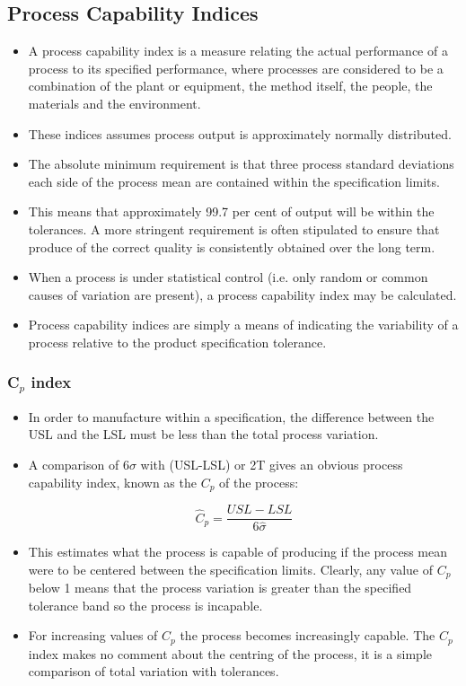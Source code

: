 \documentclass[MASTER-SPC.tex]{subfiles}
\begin{document}
	\subsection{Process Capability Indices}
\begin{itemize}
\item A process capability index is a measure relating the actual performance of a process to its specified performance, where processes are considered to be a combination of the plant or equipment, the method itself, the people, the materials and the environment. 
\item 	These indices assumes process output is approximately normally distributed.
\item 	
	The absolute minimum requirement is that three process standard deviations each side of the process mean are contained within the specification limits. 
	\item This means that approximately 99.7 per cent of output will be within the tolerances. A more stringent requirement is often stipulated to ensure that produce of the correct quality is consistently obtained over the long term.
	
\item 	When a process is under statistical control (i.e. only random or common
	causes of variation are present), a process capability index may be calculated. 
\item Process capability indices are simply a means of indicating the variability of a process relative to the product specification tolerance.
\end{itemize}	
\newpage


	
	\subsubsection*{C$_p$ index}
\begin{itemize}
\item	In order to manufacture within a specification, the difference between the
	USL and the LSL must be less than the total process variation.
	
\item A comparison of $6\sigma$ with (USL-LSL) or 2T gives an obvious process capability index, known as the $C_p$ of the process:
	
	
	\[\hat{C}_p = \frac{USL - LSL} {6 \hat{\sigma}}\]	
\item This estimates what the process is capable of producing if the process mean were to be centered between the specification limits. 
	Clearly, any value of $C_p$ below 1 means that the process variation is greater than the specified tolerance band so the process is incapable. 
	
\item For increasing values of $C_p$ the process becomes increasingly capable. The $C_p$ index makes no comment about the centring of the process, it is a simple comparison of total variation with tolerances.
\end{itemize}	
\end{document}
